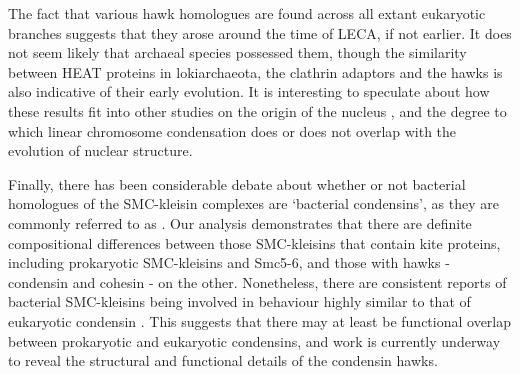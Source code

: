\documentclass[a4paper,11pt,twoside,openright]{scrbook}
\begin{document}
The fact that various hawk homologues are found across all extant eukaryotic
branches suggests that they arose around the time of LECA, if not earlier. It
does not seem likely that archaeal species possessed them, though the similarity
between HEAT proteins in lokiarchaeota, the clathrin adaptors and the hawks is
also indicative of their early evolution. It is interesting to speculate about
how these results fit into other studies on the origin of the nucleus
\cite{Devos2014,Baum2014}, and the degree to which linear chromosome
condensation does or does not overlap with the evolution of nuclear structure.

Finally, there has been considerable debate about whether or not bacterial
homologues of the SMC-kleisin complexes are `bacterial condensins', as they are
commonly referred to as \cite{Case2004,Hirano2016,Niki2016}. Our analysis
demonstrates that there are definite compositional differences between those
SMC-kleisins that contain kite proteins, including prokaryotic SMC-kleisins and
Smc5-6, and those with hawks - condensin and cohesin - on the other.
Nonetheless, there are consistent reports of bacterial SMC-kleisins being
involved in behaviour highly similar to that of eukaryotic condensin
\cite{Case2004,Wang2017}. This suggests that there may at least be functional
overlap between prokaryotic and eukaryotic condensins, and work is currently
underway to reveal the structural and functional details of the condensin hawks.

\end{document}

